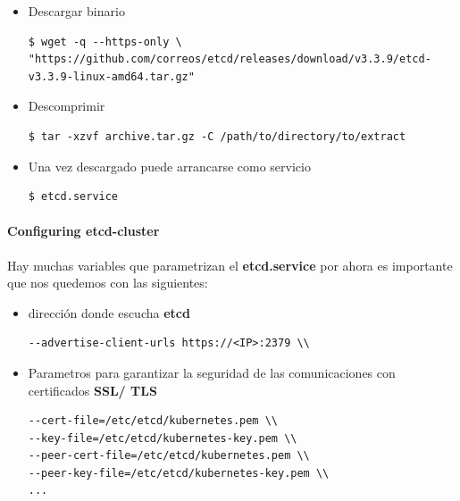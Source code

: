 \documentclass{article}
\newenvironment{codetemplate}[1][]{%
  \mybasecolorbox[#1]
  \itshape
}{%
  \endmybasecolorbox
}
\begin{document}
\begin{itemize}
    \item Descargar binario
\begin{codetemplate}{}
\begin{verbatim}
$ wget -q --https-only \ 
"https://github.com/correos/etcd/releases/download/v3.3.9/etcd-v3.3.9-linux-amd64.tar.gz"
\end{verbatim}
\end{codetemplate}

    \item Descomprimir
\begin{codetemplate}{}
\begin{verbatim}
$ tar -xzvf archive.tar.gz -C /path/to/directory/to/extract
\end{verbatim}
\end{codetemplate} 

    \item Una vez descargado puede arrancarse como servicio
\begin{codetemplate}{}
\begin{verbatim}
$ etcd.service
\end{verbatim}
\end{codetemplate}
\end{itemize}

\paragraph{Configuring etcd-cluster}

Hay muchas variables que parametrizan el \textbf{etcd.service} por ahora es importante que nos quedemos con las siguientes: 

\begin{itemize}
    \item dirección donde escucha \textbf{etcd}
\begin{codetemplate}{}
\begin{verbatim}
--advertise-client-urls https://<IP>:2379 \\
\end{verbatim}
\end{codetemplate}

    \item Parametros para garantizar la seguridad de las comunicaciones con certificados \textbf{SSL/ TLS}
\begin{codetemplate}{}
\begin{verbatim}
--cert-file=/etc/etcd/kubernetes.pem \\
--key-file=/etc/etcd/kubernetes-key.pem \\
--peer-cert-file=/etc/etcd/kubernetes.pem \\
--peer-key-file=/etc/etcd/kubernetes-key.pem \\
...
\end{verbatim}
\end{codetemplate}


\end{itemize}
\end{document}
